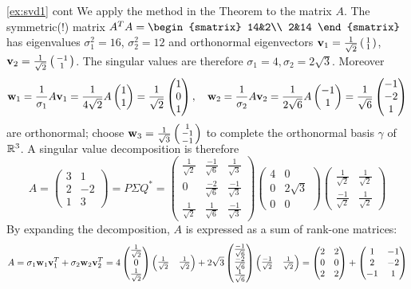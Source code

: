 \begin{example*}{\ref{ex:svd1} cont}
	We apply the method in the Theorem to the matrix $A$.\smallbreak
	The symmetric(!) matrix $A^TA=
	\begin{smatrix}
		14&2\\
		2&14
  \end{smatrix}$ 
  has eigenvalues $\sigma_1^2=16$, $\sigma_2^2=12$ and orthonormal eigenvectors ${\mathbf{v}}_1=\frac 1{\sqrt 2}\left(\begin{smallmatrix}1\\1\end{smallmatrix}\right)$, ${\mathbf{v}}_2=\frac 1{\sqrt 2}\left(\begin{smallmatrix}-1\\1\end{smallmatrix}\right)$. The singular values are therefore $\sigma_1=4,\sigma_2=2\sqrt 3$. Moreover
  \[
  	{\mathbf{w}}_1=\frac 1{\sigma_1}A{\mathbf{v}}_1=\frac 1{4\sqrt 2}A\begin{pmatrix}1\\1\end{pmatrix}=\frac 1{\sqrt 2}\begin{pmatrix}1\\0\\1\end{pmatrix},\quad 
  	{\mathbf{w}}_2=\frac 1{\sigma_2}A{\mathbf{v}}_2 =\frac 1{2\sqrt 6}A\begin{pmatrix}-1\\1\end{pmatrix}=\frac 1{\sqrt 6}\begin{pmatrix}-1\\-2\\1\end{pmatrix}
  \]
  are orthonormal; choose $\smash[b]{{\mathbf{w}}_3=\frac 1{\sqrt 3}\left(\begin{smallmatrix}1\\-1\\-1\end{smallmatrix}\right)}$ to complete the orthonormal basis $\gamma$ of $\mathbb{R}^3$. A singular value decomposition is therefore
	\[
	  A=
	  \begin{pmatrix}
	  	3&1\\
	  	2&-2\\
	  	1&3
	  \end{pmatrix}
	  =P\Sigma Q^*
	  =\begin{pmatrix}
		  \frac 1{\sqrt 2}&\frac{-1}{\sqrt 6}&\frac 1{\sqrt 3}\\
		  0&\frac{-2}{\sqrt 6}&\frac{-1}{\sqrt 3}\\
		  \frac 1{\sqrt 2}&\frac{1}{\sqrt 6}&\frac{-1}{\sqrt 3}  
	  \end{pmatrix}
	  \begin{pmatrix}
	  	4&0\\
	  	0&2\sqrt 3\\
	  	0&0
	  \end{pmatrix}
	  \begin{pmatrix}
	  	\frac 1{\sqrt 2}&\frac 1{\sqrt 2}\\
	  	\frac{-1}{\sqrt 2}&\frac 1{\sqrt 2}
	  \end{pmatrix}
	\]
	By expanding the decomposition, $A$ is expressed as a sum of rank-one matrices:
	\[
		A=\sigma_1{\mathbf{w}}_1{\mathbf{v}}_1^T+\sigma_2{\mathbf{w}}_2{\mathbf{v}}_2^T 
		=4\begin{pmatrix}\frac 1{\sqrt 2}\\0\\\frac 1{\sqrt 2}\end{pmatrix}
		\begin{pmatrix}
			\frac 1{\sqrt 2}&\frac 1{\sqrt 2}
		\end{pmatrix}
		+
		2\sqrt 3\begin{pmatrix}\frac{-1}{\sqrt 6}\\\frac{-2}{\sqrt 6}\\\frac{1}{\sqrt 6}\end{pmatrix}
		\begin{pmatrix}
			\frac{-1}{\sqrt 2}&\frac 1{\sqrt 2}
		\end{pmatrix}
		=\begin{pmatrix}
		  2&2\\
		  0&0\\
		  2&2
		\end{pmatrix}
		+
		\begin{pmatrix}
		  1&-1\\
		  2&-2\\
		  -1&1
		\end{pmatrix}
	\]
\end{example*}


